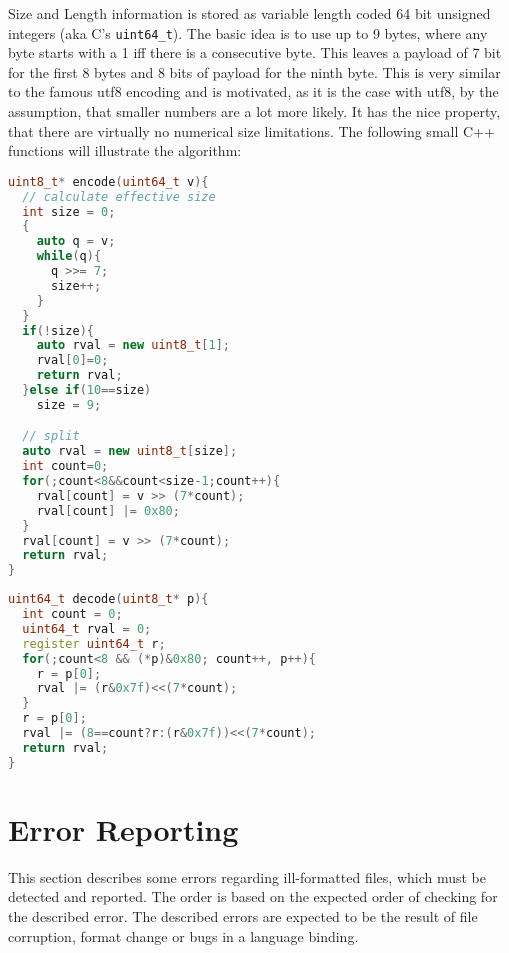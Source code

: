 \documentclass[a4paper,10pt]{article}
\begin{document}
Size and Length information is stored as variable length coded 64 bit unsigned integers (aka C's \texttt{uint64\_t}). The basic idea is to use up to 9 bytes, where any byte starts with a 1 iff there is a consecutive byte. This leaves a payload of 7 bit for the first 8 bytes and 8 bits of payload for the ninth byte. This is very similar to the famous utf8 encoding and is motivated, as it is the case with utf8, by the assumption, that smaller numbers are a lot more likely. It has the nice property, that there are virtually no numerical size limitations.
The following small C++ functions will illustrate the algorithm:
\begin{lstlisting}[label=v64enc,caption=Variable Length Encoding,language=C++]
uint8_t* encode(uint64_t v){
  // calculate effective size
  int size = 0;
  {
    auto q = v;
    while(q){
      q >>= 7;
      size++;
    }
  }
  if(!size){
    auto rval = new uint8_t[1];
    rval[0]=0;
    return rval;
  }else if(10==size)
    size = 9;

  // split
  auto rval = new uint8_t[size];
  int count=0;
  for(;count<8&&count<size-1;count++){
    rval[count] = v >> (7*count);
    rval[count] |= 0x80;
  }
  rval[count] = v >> (7*count);
  return rval;
}
\end{lstlisting}
\begin{lstlisting}[label=v64dec,caption=Variable Length Decoding,language=C++]
uint64_t decode(uint8_t* p){
  int count = 0;
  uint64_t rval = 0;
  register uint64_t r;
  for(;count<8 && (*p)&0x80; count++, p++){
    r = p[0];
    rval |= (r&0x7f)<<(7*count);
  }
  r = p[0];
  rval |= (8==count?r:(r&0x7f))<<(7*count);
  return rval;
}
\end{lstlisting}


\section{Error Reporting}

This section describes some errors regarding ill-formatted files, which must be detected and reported. The order is based on the expected order of checking for the described error. The described errors are expected to be the result of file corruption, format change or bugs in a language binding.
\end{document}
